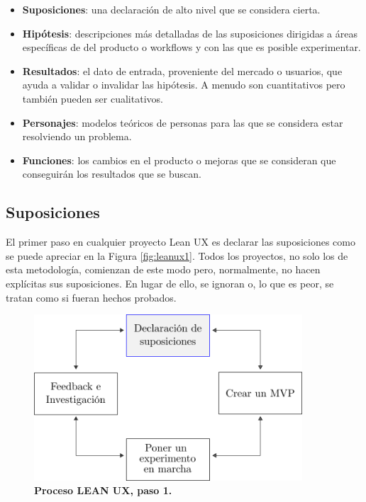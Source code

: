 \begin{itemize}
    \item \textbf{Suposiciones}: una declaración de alto nivel que se considera cierta. 
    \item \textbf{Hipótesis}: descripciones más detalladas de las suposiciones dirigidas a áreas específicas de del producto o workflows y con las que es posible experimentar. 
    \item \textbf{Resultados}: el dato de entrada, proveniente del mercado o usuarios, que ayuda a validar o invalidar las hipótesis. A menudo son cuantitativos pero también pueden ser cualitativos. 
    \item \textbf{Personajes}: modelos teóricos de personas para las que se considera estar resolviendo un problema. 
    \item \textbf{Funciones}: los cambios en el producto o mejoras que se consideran que conseguirán los resultados que se buscan.

\end{itemize}

\subsection{Suposiciones}
El primer paso en cualquier proyecto Lean UX es declarar las suposiciones como se puede apreciar en la Figura \ref{fig:leanux1}. Todos los proyectos, no solo los de esta metodología, comienzan de este modo pero, normalmente, no hacen explícitas sus suposiciones. En lugar de ello, se ignoran o, lo que es peor, se tratan como si fueran hechos probados.

\begin{figure}[h]
\includegraphics[width=10cm]{Img/Desarrollo/desarrollo1.png}
\centering
\caption{\textbf{ \footnotesize{Proceso LEAN UX, paso 1. }}}
\end{figure}
\label{fig:leanux1}

